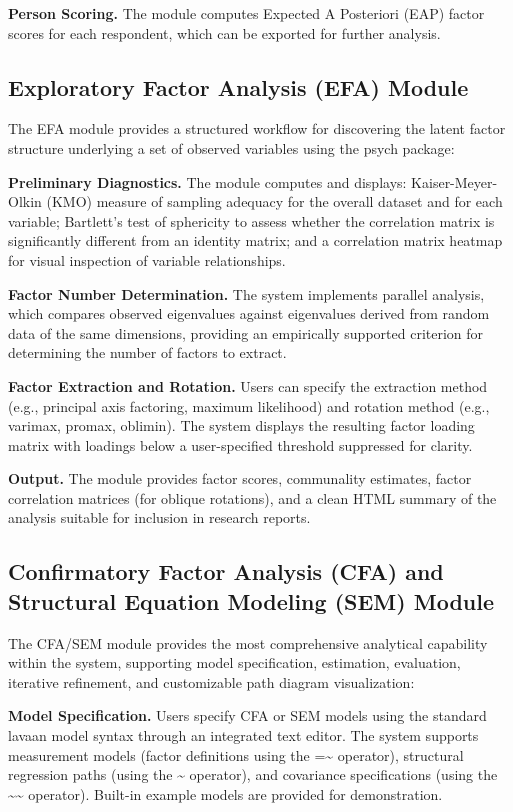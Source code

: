 \documentclass[12pt,a4paper]{article}
\begin{document}
\textbf{Person Scoring.} The module computes Expected A Posteriori (EAP) factor scores for each respondent, which can be exported for further analysis.

\subsection{Exploratory Factor Analysis (EFA) Module}

The EFA module provides a structured workflow for discovering the latent factor structure underlying a set of observed variables using the psych package:

\textbf{Preliminary Diagnostics.} The module computes and displays: Kaiser-Meyer-Olkin (KMO) measure of sampling adequacy for the overall dataset and for each variable; Bartlett's test of sphericity to assess whether the correlation matrix is significantly different from an identity matrix; and a correlation matrix heatmap for visual inspection of variable relationships.

\textbf{Factor Number Determination.} The system implements parallel analysis, which compares observed eigenvalues against eigenvalues derived from random data of the same dimensions, providing an empirically supported criterion for determining the number of factors to extract.

\textbf{Factor Extraction and Rotation.} Users can specify the extraction method (e.g., principal axis factoring, maximum likelihood) and rotation method (e.g., varimax, promax, oblimin). The system displays the resulting factor loading matrix with loadings below a user-specified threshold suppressed for clarity.

\textbf{Output.} The module provides factor scores, communality estimates, factor correlation matrices (for oblique rotations), and a clean HTML summary of the analysis suitable for inclusion in research reports.

\subsection{Confirmatory Factor Analysis (CFA) and Structural Equation Modeling (SEM) Module}

The CFA/SEM module provides the most comprehensive analytical capability within the system, supporting model specification, estimation, evaluation, iterative refinement, and customizable path diagram visualization:

\textbf{Model Specification.} Users specify CFA or SEM models using the standard lavaan model syntax through an integrated text editor. The system supports measurement models (factor definitions using the =\textasciitilde{} operator), structural regression paths (using the \textasciitilde{} operator), and covariance specifications (using the \textasciitilde{}\textasciitilde{} operator). Built-in example models are provided for demonstration.
\end{document}
